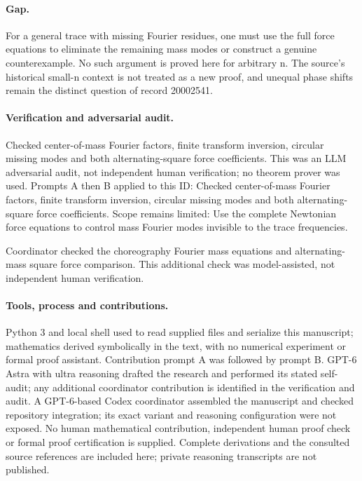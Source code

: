 \documentclass[11pt]{article}
\begin{document}
\paragraph{Gap.}For a general trace with missing Fourier residues, one must use the full force equations to eliminate the remaining mass modes or construct a genuine counterexample. No such argument is proved here for arbitrary n. The source's historical small-n context is not treated as a new proof, and unequal phase shifts remain the distinct question of record 20002541.

\paragraph{Verification and adversarial audit.}
Checked center-of-mass Fourier factors, finite transform inversion, circular missing modes and both alternating-square force coefficients. This was an LLM adversarial audit, not independent human verification; no theorem prover was used. Prompts A then B applied to this ID: Checked center-of-mass Fourier factors, finite transform inversion, circular missing modes and both alternating-square force coefficients. Scope remains limited: Use the complete Newtonian force equations to control mass Fourier modes invisible to the trace frequencies.

Coordinator checked the choreography Fourier mass equations and alternating-mass square force comparison. This additional check was model-assisted, not independent human verification.

\paragraph{Tools, process and contributions.}
Python 3 and local shell used to read supplied files and serialize this manuscript; mathematics derived symbolically in the text, with no numerical experiment or formal proof assistant. Contribution prompt A was followed by prompt B. GPT-6 Astra with ultra reasoning drafted the research and performed its stated self-audit; any additional coordinator contribution is identified in the verification and audit. A GPT-6-based Codex coordinator assembled the manuscript and checked repository integration; its exact variant and reasoning configuration were not exposed. No human mathematical contribution, independent human proof check or formal proof certification is supplied. Complete derivations and the consulted source references are included here; private reasoning transcripts are not published.
\end{document}
